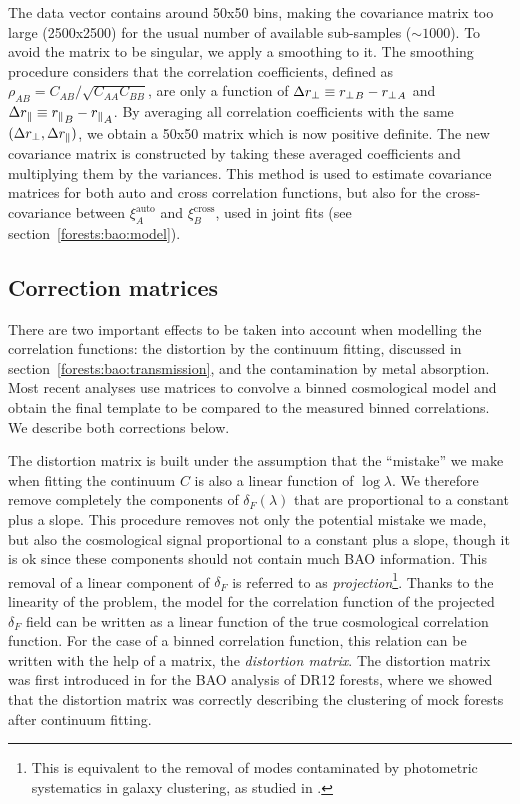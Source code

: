 The data vector contains around 50x50 bins, making the covariance matrix too large (2500x2500)
for the usual number of available sub-samples ($\sim 1000$). To avoid the matrix to be 
singular, we apply a smoothing to it. The smoothing procedure considers that the 
correlation coefficients, defined as $\rho_{AB} = C_{AB}/\sqrt{C_{AA} C_{BB}}$, 
are only a function of $\Delta {r_\perp} \equiv {r_\perp}_B - {r_\perp}_A$ and 
$\Delta {r_\parallel} \equiv {r_\parallel}_B - {r_\parallel}_A$. By averaging all correlation coefficients
with the same $(\Delta {r_\perp}, \Delta {r_\parallel})$, we obtain a 50x50 matrix which is now 
positive definite. The new covariance matrix is constructed by taking these averaged 
coefficients and multiplying them by the variances. This method is used to estimate 
covariance matrices for both auto and cross correlation functions, but also for the 
cross-covariance between $\xi^\mathrm{auto}_A$ and $\xi^\mathrm{cross}_B$, used in 
joint fits (see section~\ref{forests:bao:model}).



\subsection{Correction matrices}
\label{forests:bao:matrices}

There are two important effects to be taken into account when modelling 
the \lya correlation functions: the distortion by the continuum fitting, discussed 
in section~\ref{forests:bao:transmission}, and the contamination by metal 
absorption. Most recent analyses use matrices to convolve a binned 
cosmological model and obtain the final template to be compared to 
the measured binned correlations. We describe both corrections below. 

The distortion matrix is built under the assumption that the ``mistake''
we make when fitting the continuum $C$ is also a linear function 
of $\log \lambda$. We therefore remove completely the components of $\delta_F(\lambda)$
that are proportional to a constant plus a slope. This procedure removes
not only the potential mistake we made, 
but also the cosmological signal proportional to a constant plus a slope,
though it is ok since these components should not contain much BAO information.
This removal of a linear component of $\delta_F$ is referred to as 
\emph{projection}\footnote{This is equivalent to the removal of modes 
contaminated by photometric systematics in galaxy clustering, as studied 
in \cite{paviotAngularSystematicsfreeCosmological2022}.}.
Thanks to the linearity of the problem, the model for the correlation function of 
the projected $\delta_F$ field can be written as a linear function of the 
true cosmological correlation function. For the case of a binned correlation function, 
this relation can be written with the help of a matrix, the \emph{distortion matrix}.
The distortion matrix was first introduced in \cite{bautistaMeasurementBaryonAcoustic2017}
for the BAO analysis of DR12 forests, where we showed that the distortion matrix 
was correctly describing the clustering of mock forests after continuum fitting. 

